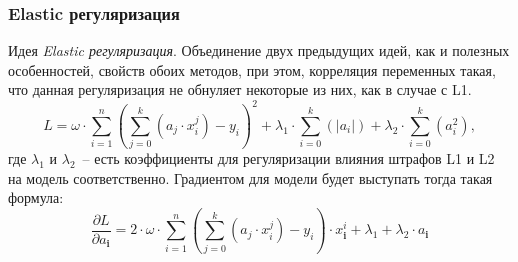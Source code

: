 \documentclass[12pt, a4paper, oneside, final]{article}
\begin{document}
	\subsubsection*{Elastic регуляризация}
	Идея \textit{Elastic регуляризация}.
	Объединение двух предыдущих идей, как и полезных особенностей, свойств обоих методов, при этом, корреляция переменных такая, что данная регуляризация не обнуляет некоторые из них, как в случае с L1.
	\[
		L = \omega\cdot\sum\limits_{i = 1}^{n}{\left(\sum\limits_{j = 0}^{k}{\left(a_{j} \cdot x^{j}_{i}\right)} - y_{i}\right)^{2}} + \lambda_{1} \cdot \sum\limits_{i = 0}^{k}{\left(|a_{i}|\right)} + \lambda_{2} \cdot \sum\limits_{i = 0}^{k}{\left(a_{i}^2\right)},
	\]
	где $\lambda_{1}$ и $\lambda_{2}$~-- есть коэффициенты для регуляризации влияния штрафов L1 и L2 на модель соответственно.
	Градиентом для модели будет выступать тогда такая формула:
	\[
		\dfrac{\partial{L}}{\partial{a_{\mathbf{i}}}} = 2\cdot\omega\cdot\sum\limits_{i = 1}^{n}{\left(\sum\limits_{j = 0}^{k}{\left(a_{j} \cdot x_{i}^{j}\right)} - y_{i}\right) \cdot x^{i}_{\mathbf{i}}} + \lambda_{1} + \lambda_{2} \cdot a_{\mathbf{i}}
	\]
\end{document}
